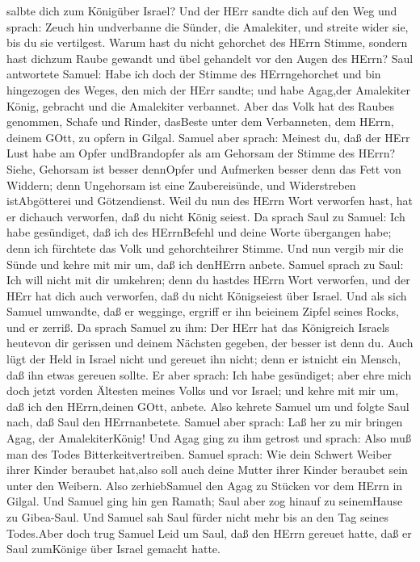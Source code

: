salbte dich zum Königüber Israel?  Und der HErr sandte dich
auf den Weg und sprach: Zeuch hin undverbanne die Sünder, die
Amalekiter, und streite wider sie, bis du sie vertilgest. 
Warum hast du nicht gehorchet des HErrn Stimme, sondern hast dichzum
Raube gewandt und übel gehandelt vor den Augen des HErrn? 
Saul antwortete Samuel: Habe ich doch der Stimme des HErrngehorchet und
bin hingezogen des Weges, den mich der HErr sandte; und habe Agag,der
Amalekiter König, gebracht und die Amalekiter verbannet. 
Aber das Volk hat des Raubes genommen, Schafe und Rinder, dasBeste unter
dem Verbanneten, dem HErrn, deinem GOtt, zu opfern in Gilgal.
 Samuel aber sprach: Meinest du, daß der HErr Lust habe am
Opfer undBrandopfer als am Gehorsam der Stimme des HErrn? Siehe,
Gehorsam ist besser dennOpfer und Aufmerken besser denn das Fett von
Widdern;  denn Ungehorsam ist eine Zaubereisünde, und
Widerstreben istAbgötterei und Götzendienst. Weil du nun des HErrn Wort
verworfen hast, hat er dichauch verworfen, daß du nicht König seiest.
 Da sprach Saul zu Samuel: Ich habe gesündiget, daß ich des
HErrnBefehl und deine Worte übergangen habe; denn ich fürchtete das Volk
und gehorchteihrer Stimme.  Und nun vergib mir die Sünde
und kehre mit mir um, daß ich denHErrn anbete.  Samuel
sprach zu Saul: Ich will nicht mit dir umkehren; denn du hastdes HErrn
Wort verworfen, und der HErr hat dich auch verworfen, daß du nicht
Königseiest über Israel.  Und als sich Samuel umwandte, daß
er wegginge, ergriff er ihn beieinem Zipfel seines Rocks, und er zerriß.
 Da sprach Samuel zu ihm: Der HErr hat das Königreich
Israels heutevon dir gerissen und deinem Nächsten gegeben, der besser
ist denn du.  Auch lügt der Held in Israel nicht und
gereuet ihn nicht; denn er istnicht ein Mensch, daß ihn etwas gereuen
sollte.  Er aber sprach: Ich habe gesündiget; aber ehre
mich doch jetzt vorden Ältesten meines Volks und vor Israel; und kehre
mit mir um, daß ich den HErrn,deinen GOtt, anbete.  Also
kehrete Samuel um und folgte Saul nach, daß Saul den HErrnanbetete.
 Samuel aber sprach: Laß her zu mir bringen Agag, der
AmalekiterKönig! Und Agag ging zu ihm getrost und sprach: Also muß man
des Todes Bitterkeitvertreiben.  Samuel sprach: Wie dein
Schwert Weiber ihrer Kinder beraubet hat,also soll auch deine Mutter
ihrer Kinder beraubet sein unter den Weibern. Also zerhiebSamuel den
Agag zu Stücken vor dem HErrn in Gilgal.  Und Samuel ging
hin gen Ramath; Saul aber zog hinauf zu seinemHause zu Gibea-Saul.
 Und Samuel sah Saul fürder nicht mehr bis an den Tag
seines Todes.Aber doch trug Samuel Leid um Saul, daß den HErrn gereuet
hatte, daß er Saul zumKönige über Israel gemacht hatte.

